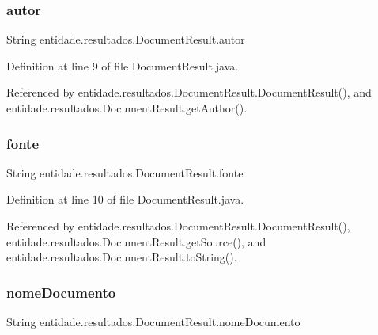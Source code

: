 \subsubsection{\texorpdfstring{autor}{autor}}
{\footnotesize\ttfamily String entidade.\+resultados.\+Document\+Result.\+autor\hspace{0.3cm}{\ttfamily [private]}}



Definition at line 9 of file Document\+Result.\+java.



Referenced by entidade.\+resultados.\+Document\+Result.\+Document\+Result(), and entidade.\+resultados.\+Document\+Result.\+get\+Author().

\hypertarget{classentidade_1_1resultados_1_1DocumentResult_ad7180ea32ea41099262d5ca323fa7aa4}{}\label{classentidade_1_1resultados_1_1DocumentResult_ad7180ea32ea41099262d5ca323fa7aa4} 
\subsubsection{\texorpdfstring{fonte}{fonte}}
{\footnotesize\ttfamily String entidade.\+resultados.\+Document\+Result.\+fonte\hspace{0.3cm}{\ttfamily [private]}}



Definition at line 10 of file Document\+Result.\+java.



Referenced by entidade.\+resultados.\+Document\+Result.\+Document\+Result(), entidade.\+resultados.\+Document\+Result.\+get\+Source(), and entidade.\+resultados.\+Document\+Result.\+to\+String().

\hypertarget{classentidade_1_1resultados_1_1DocumentResult_ad7a0e1860d8f76fc15d65dab6cec9ac7}{}\label{classentidade_1_1resultados_1_1DocumentResult_ad7a0e1860d8f76fc15d65dab6cec9ac7} 
\subsubsection{\texorpdfstring{nome\+Documento}{nomeDocumento}}
{\footnotesize\ttfamily String entidade.\+resultados.\+Document\+Result.\+nome\+Documento\hspace{0.3cm}{\ttfamily [private]}}



